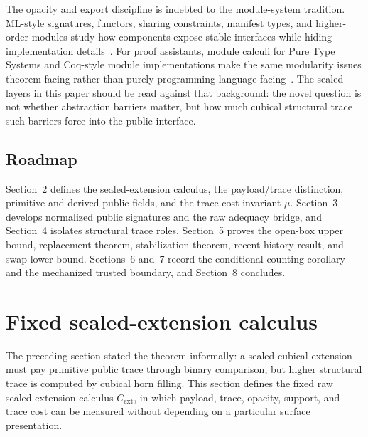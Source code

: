 \documentclass{lmcs}
\begin{document}
The opacity and export discipline is indebted to the module-system tradition.
ML-style signatures, functors, sharing constraints, manifest types, and
higher-order modules study how components expose stable interfaces while hiding
implementation details~\cite{macqueen-modules,harper-lillibridge,leroy-manifest,dreyer-higher-modules}.
For proof assistants, module calculi for Pure Type Systems and Coq-style module
implementations make the same modularity issues theorem-facing rather than
purely programming-language-facing~\cite{courant-pts-modules,chrzaszcz-coq-modules,filliatre-letouzey}.
The sealed layers in this paper should be read against that background: the
novel question is not whether abstraction barriers matter, but how much cubical
structural trace such barriers force into the public interface.

\subsection{Roadmap}

Section~2 defines the sealed-extension calculus, the payload/trace distinction,
primitive and derived public fields, and the trace-cost invariant \(\mu\).
Section~3 develops normalized public signatures and the raw adequacy bridge,
and Section~4 isolates structural trace roles.  Section~5 proves the open-box
upper bound, replacement theorem, stabilization theorem, recent-history result,
and swap lower bound.  Sections~6 and~7 record the conditional counting
corollary and the mechanized trusted boundary, and Section~8 concludes.

\section{Fixed sealed-extension calculus}
\label{sec:fixed-calculus}

The preceding section stated the theorem informally: a sealed cubical extension must pay
primitive public trace through binary comparison, but higher structural trace is computed by
cubical horn filling.  This section defines the fixed raw sealed-extension calculus
\(C_{\mathrm{ext}}\), in which payload, trace, opacity, support, and trace cost can be measured
without depending on a particular surface presentation.
\end{document}
